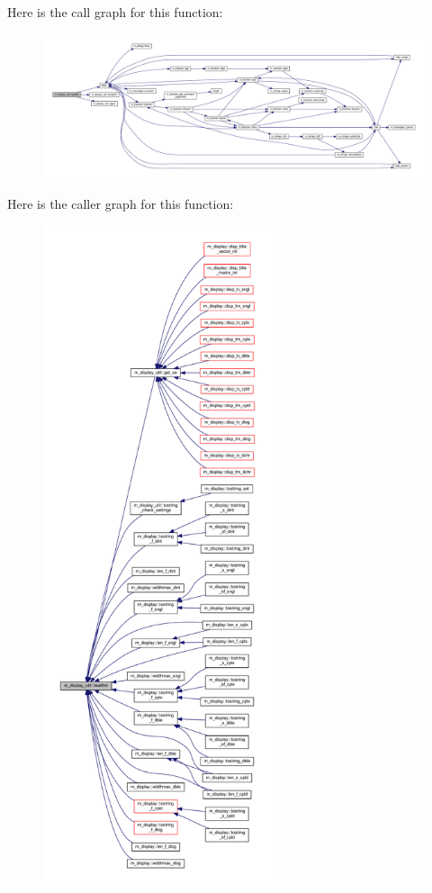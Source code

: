 Here is the call graph for this function\+:
\nopagebreak
\begin{figure}[H]
\begin{center}
\leavevmode
\includegraphics[width=350pt]{namespacem__display__util_a73ae4e30d2dcf1f608ac24bf1623ee6c_cgraph}
\end{center}
\end{figure}
Here is the caller graph for this function\+:
\nopagebreak
\begin{figure}[H]
\begin{center}
\leavevmode
\includegraphics[height=550pt]{namespacem__display__util_a73ae4e30d2dcf1f608ac24bf1623ee6c_icgraph}
\end{center}
\end{figure}
\mbox{\label{namespacem__display__util_a76a458454b83026c12d4a90882f2719e}} 
